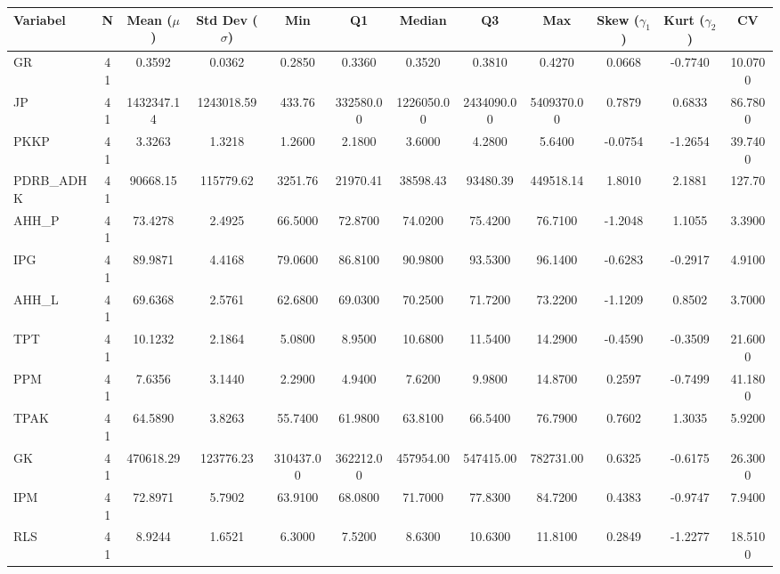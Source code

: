 \begin{adjustbox}{max width=\textwidth}
\small
\begin{tabular}{|p{2.5cm}|c|c|c|c|c|c|c|c|c|c|c|}
\hline
\textbf{Variabel} & \textbf{N} & \textbf{Mean ($\mu$)} & \textbf{Std Dev ($\sigma$)} & \textbf{Min} & \textbf{Q1} & \textbf{Median} & \textbf{Q3} & \textbf{Max} & \textbf{Skew ($\gamma_1$)} & \textbf{Kurt ($\gamma_2$)} & \textbf{CV} \\
\hline
GR & 41 & 0.3592 & 0.0362 & 0.2850 & 0.3360 & 0.3520 & 0.3810 & 0.4270 & 0.0668 & -0.7740 & 10.0700 \\
JP & 41 & 1432347.14 & 1243018.59 & 433.76 & 332580.00 & 1226050.00 & 2434090.00 & 5409370.00 & 0.7879 & 0.6833 & 86.7800 \\
PKKP & 41 & 3.3263 & 1.3218 & 1.2600 & 2.1800 & 3.6000 & 4.2800 & 5.6400 & -0.0754 & -1.2654 & 39.7400 \\
PDRB\_ADHK & 41 & 90668.15 & 115779.62 & 3251.76 & 21970.41 & 38598.43 & 93480.39 & 449518.14 & 1.8010 & 2.1881 & 127.70 \\
AHH\_P & 41 & 73.4278 & 2.4925 & 66.5000 & 72.8700 & 74.0200 & 75.4200 & 76.7100 & -1.2048 & 1.1055 & 3.3900 \\
IPG & 41 & 89.9871 & 4.4168 & 79.0600 & 86.8100 & 90.9800 & 93.5300 & 96.1400 & -0.6283 & -0.2917 & 4.9100 \\
AHH\_L & 41 & 69.6368 & 2.5761 & 62.6800 & 69.0300 & 70.2500 & 71.7200 & 73.2200 & -1.1209 & 0.8502 & 3.7000 \\
TPT & 41 & 10.1232 & 2.1864 & 5.0800 & 8.9500 & 10.6800 & 11.5400 & 14.2900 & -0.4590 & -0.3509 & 21.6000 \\
PPM & 41 & 7.6356 & 3.1440 & 2.2900 & 4.9400 & 7.6200 & 9.9800 & 14.8700 & 0.2597 & -0.7499 & 41.1800 \\
TPAK & 41 & 64.5890 & 3.8263 & 55.7400 & 61.9800 & 63.8100 & 66.5400 & 76.7900 & 0.7602 & 1.3035 & 5.9200 \\
GK & 41 & 470618.29 & 123776.23 & 310437.00 & 362212.00 & 457954.00 & 547415.00 & 782731.00 & 0.6325 & -0.6175 & 26.3000 \\
IPM & 41 & 72.8971 & 5.7902 & 63.9100 & 68.0800 & 71.7000 & 77.8300 & 84.7200 & 0.4383 & -0.9747 & 7.9400 \\
RLS & 41 & 8.9244 & 1.6521 & 6.3000 & 7.5200 & 8.6300 & 10.6300 & 11.8100 & 0.2849 & -1.2277 & 18.5100 \\
\hline
\end{tabular}
\end{adjustbox}

